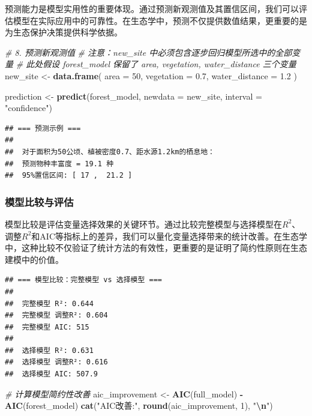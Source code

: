 \documentclass[
  twoside,12pt,fontset=none]{ctexbook}
\newenvironment{Shaded}{\begin{snugshade}}{\end{snugshade}}
\newcommand{\AttributeTok}[1]{\textcolor[rgb]{0.13,0.29,0.53}{#1}}
\newcommand{\CommentTok}[1]{\textcolor[rgb]{0.56,0.35,0.01}{\textit{#1}}}
\newcommand{\DecValTok}[1]{\textcolor[rgb]{0.00,0.00,0.81}{#1}}
\newcommand{\FloatTok}[1]{\textcolor[rgb]{0.00,0.00,0.81}{#1}}
\newcommand{\FunctionTok}[1]{\textcolor[rgb]{0.13,0.29,0.53}{\textbf{#1}}}
\newcommand{\NormalTok}[1]{#1}
\newcommand{\OtherTok}[1]{\textcolor[rgb]{0.56,0.35,0.01}{#1}}
\newcommand{\SpecialCharTok}[1]{\textcolor[rgb]{0.81,0.36,0.00}{\textbf{#1}}}
\newcommand{\StringTok}[1]{\textcolor[rgb]{0.31,0.60,0.02}{#1}}
\begin{document}
预测能力是模型实用性的重要体现。通过预测新观测值及其置信区间，我们可以评估模型在实际应用中的可靠性。在生态学中，预测不仅提供数值结果，更重要的是为生态保护决策提供科学依据。

\begin{Shaded}
\begin{Highlighting}[]
\CommentTok{\# 8. 预测新观测值}
\CommentTok{\# 注意：new\_site 中必须包含逐步回归模型所选中的全部变量}
\CommentTok{\# 此处假设 forest\_model 保留了 area, vegetation, water\_distance 三个变量}
\NormalTok{new\_site }\OtherTok{\textless{}{-}} \FunctionTok{data.frame}\NormalTok{(}
  \AttributeTok{area =} \DecValTok{50}\NormalTok{,}
  \AttributeTok{vegetation =} \FloatTok{0.7}\NormalTok{,}
  \AttributeTok{water\_distance =} \FloatTok{1.2}
\NormalTok{)}

\NormalTok{prediction }\OtherTok{\textless{}{-}} \FunctionTok{predict}\NormalTok{(forest\_model, }\AttributeTok{newdata =}\NormalTok{ new\_site,}
                      \AttributeTok{interval =} \StringTok{"confidence"}\NormalTok{)}
\end{Highlighting}
\end{Shaded}

\begin{verbatim}
## === 预测示例 ===
## 
##  对于面积为50公顷、植被密度0.7、距水源1.2km的栖息地：
##  预测物种丰富度 = 19.1 种
##  95%置信区间: [ 17 ,  21.2 ]
\end{verbatim}

\hypertarget{ux6a21ux578bux6bd4ux8f83ux4e0eux8bc4ux4f30}{%
\subsubsection{模型比较与评估}\label{ux6a21ux578bux6bd4ux8f83ux4e0eux8bc4ux4f30}}

模型比较是评估变量选择效果的关键环节。通过比较完整模型与选择模型在\(R^2\)、调整\(R^2\)和AIC等指标上的差异，我们可以量化变量选择带来的统计改善。在生态学中，这种比较不仅验证了统计方法的有效性，更重要的是证明了简约性原则在生态建模中的价值。

\begin{verbatim}
## === 模型比较：完整模型 vs 选择模型 ===
## 
##  完整模型 R²: 0.644 
##  完整模型 调整R²: 0.604 
##  完整模型 AIC: 515 
## 
##  选择模型 R²: 0.631 
##  选择模型 调整R²: 0.616 
##  选择模型 AIC: 507.9
\end{verbatim}

\begin{Shaded}
\begin{Highlighting}[]
\CommentTok{\# 计算模型简约性改善}
\NormalTok{aic\_improvement }\OtherTok{\textless{}{-}} \FunctionTok{AIC}\NormalTok{(full\_model) }\SpecialCharTok{{-}} \FunctionTok{AIC}\NormalTok{(forest\_model)}
\FunctionTok{cat}\NormalTok{(}\StringTok{"AIC改善:"}\NormalTok{, }\FunctionTok{round}\NormalTok{(aic\_improvement, }\DecValTok{1}\NormalTok{), }\StringTok{"}\SpecialCharTok{\textbackslash{}n}\StringTok{"}\NormalTok{)}
\end{Highlighting}
\end{Shaded}
\end{document}
